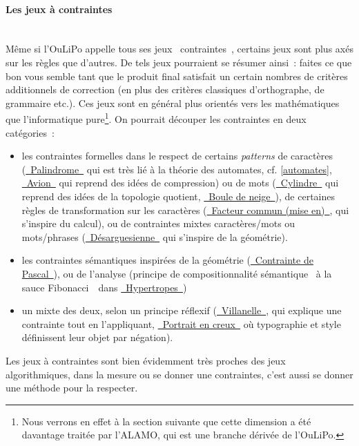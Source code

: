 \documentclass{article}
\newcommand{\subsubsubsection}[1]{\paragraph{#1}\mbox{}\\}
\begin{document}
				\subsubsubsection{Les jeux à contraintes}
					Même si l'OuLiPo appelle tous ses jeux \guillemotleft~contraintes~\guillemotright, certains jeux sont plus axés sur les règles que d'autres. De tels jeux pourraient se résumer ainsi~: faites ce que bon vous semble tant que le produit final satisfait un certain nombres de critères additionnels de correction (en plus des critères classiques d'orthographe, de grammaire etc.). Ces jeux sont en général plus orientés vers les mathématiques que l'informatique pure\footnote{Nous verrons en effet à la section suivante que cette dimension a été davantage traitée par l'ALAMO, qui est une branche dérivée de l'OuLiPo.}. On pourrait découper les contraintes en deux catégories~:
					\vspace{2mm}
					\begin{itemize}
						\item les contraintes formelles dans le respect de certains \textit{patterns} de caractères (\href{http://oulipo.net/fr/contraintes/palindrome}{\guillemotleft~Palindrome~\guillemotright} qui est très lié à la théorie des automates, cf. \ref{automates}, \href{http://oulipo.net/fr/contraintes/avion}{\guillemotleft~Avion~\guillemotright} qui reprend des idées de compression) ou de mots (\href{http://oulipo.net/fr/contraintes/cylindre}{\guillemotleft~Cylindre~\guillemotright} qui reprend des idées de la topologie quotient, \href{http://oulipo.net/fr/contraintes/cylindre}{\guillemotleft~Boule de neige~\guillemotright}), de certaines règles de transformation sur les caractères (\href{http://oulipo.net/fr/contraintes/facteur-commun-mise-en}{\guillemotleft~Facteur commun (mise en)~\guillemotright}, qui s'inspire du calcul), 	ou de contraintes mixtes caractères/mots ou mots/phrases (\href{http://oulipo.net/fr/contraintes/desarguesienne}{\guillemotleft~Désarguesienne~\guillemotright} qui s'inspire de la géométrie).
						\item les contraintes sémantiques inspirées de la géométrie (\href{http://oulipo.net/fr/contraintes/contrainte-de-pascal}{\guillemotleft~Contrainte de Pascal~\guillemotright}), ou de l'analyse (principe de compositionnalité sémantique \guillemotleft~à la sauce Fibonacci~\guillemotright~dans \href{http://oulipo.net/fr/contraintes/hypertropes}{\guillemotleft~Hypertropes~\guillemotright})
						\item un mixte des deux, selon un principe réflexif (\href{http://oulipo.net/fr/contraintes/villanelle}{\guillemotleft~Villanelle~\guillemotright}, qui explique une contrainte tout en l'appliquant, \href{http://oulipo.net/fr/contraintes/portrait-en-creux}{\guillemotleft~Portrait en creux~\guillemotright} où typographie et style définissent leur objet par négation).
					\end{itemize}
					\vspace{2mm}
					Les jeux à contraintes sont bien évidemment très proches des jeux algorithmiques, dans la mesure ou se donner une contraintes, c'est aussi se donner une méthode pour la respecter. 
				
\end{document}

